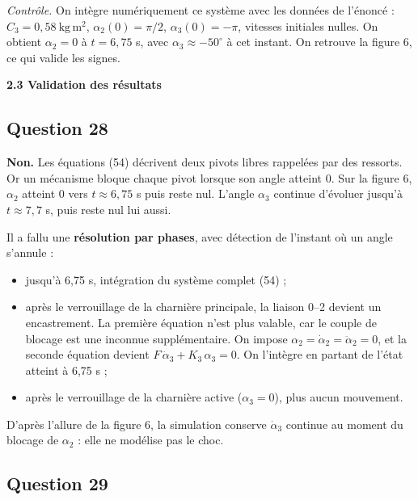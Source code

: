\documentclass[11pt,a4paper]{article}
\providecommand{\tightlist}{\setlength{\itemsep}{0pt}\setlength{\parskip}{0pt}}
\begin{document}
\emph{Contrôle.} On intègre numériquement ce système avec les données de l'énoncé : \(C_3=0{,}58\ \mathrm{kg\,m^2}\), \(\alpha_2(0)=\pi/2\), \(\alpha_3(0)=-\pi\), vitesses initiales nulles. On obtient \(\alpha_2=0\) à \(t=6{,}75\) s, avec \(\alpha_3\approx-50^\circ\) à cet instant. On retrouve la figure 6, ce qui valide les signes.

\textbf{2.3 Validation des résultats}

\hypertarget{question-28}{%
\subsection{Question 28}\label{question-28}}

\textbf{Non.} Les équations (54) décrivent deux pivots libres rappelées par des ressorts. Or un mécanisme bloque chaque pivot lorsque son angle atteint 0. Sur la figure 6, \(\alpha_2\) atteint 0 vers \(t\approx6{,}75\) s puis reste nul. L'angle \(\alpha_3\) continue d'évoluer jusqu'à \(t\approx7{,}7\) s, puis reste nul lui aussi.

Il a fallu une \textbf{résolution par phases}, avec détection de l'instant où un angle s'annule :

\begin{itemize}
\tightlist
\item
  jusqu'à 6,75 s, intégration du système complet (54) ;
\item
  après le verrouillage de la charnière principale, la liaison 0--2 devient un encastrement. La première équation n'est plus valable, car le couple de blocage est une inconnue supplémentaire. On impose \(\alpha_2=\dot\alpha_2=\ddot\alpha_2=0\), et la seconde équation devient \(F\,\ddot\alpha_3+K_3\,\alpha_3=0\). On l'intègre en partant de l'état atteint à 6,75 s ;
\item
  après le verrouillage de la charnière active (\(\alpha_3=0\)), plus aucun mouvement.
\end{itemize}

D'après l'allure de la figure 6, la simulation conserve \(\dot\alpha_3\) continue au moment du blocage de \(\alpha_2\) : elle ne modélise pas le choc.

\hypertarget{question-29}{%
\subsection{Question 29}\label{question-29}}
\end{document}
